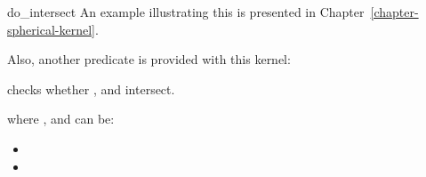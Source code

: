 \begin{ccRefFunction}{do_intersect}
An example illustrating this is presented in
Chapter~\ref{chapter-spherical-kernel}.

Also, another predicate is provided with this kernel:

{checks whether ,  and  intersect.}

where ,  and  can be:
\begin{itemize}
\item {}
\item {}
\end{itemize}

\ccSeeAlso
{}

\end{ccRefFunction}
